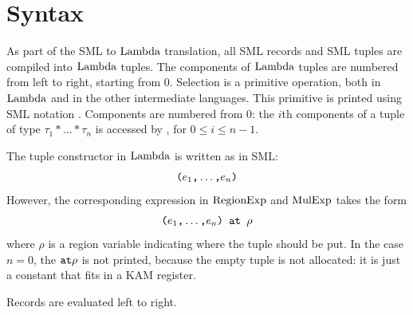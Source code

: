 \documentclass[12pt]{book}
\begin{document}
\section{Syntax}
As part of the SML to $\hbox{\rm Lambda}$ translation, all SML records and SML tuples are compiled into
$\hbox{\rm Lambda}$ tuples. The components of $\hbox{\rm Lambda}$ tuples are numbered from left to right, starting from 0.
Selection is a primitive operation, both in $\hbox{\rm Lambda}$ and in the other
intermediate languages. This primitive is printed using SML notation 
. Components are numbered from 0: the $i$th components of
a tuple of type $\tau_1\ast\ldots\ast\tau_n$ is accessed by
, for $0\leq i\leq n-1$. 

The tuple constructor in $\hbox{\rm Lambda}$ is written as in SML:
$$\hbox{\tt (}e_1\hbox{\tt ,}\ldots\hbox{\tt ,}e_n\hbox{\tt )}$$
However, the corresponding expression in $\hbox{\rm RegionExp}$ and $\hbox{\rm MulExp}$ takes the form
$$\hbox{\tt (}e_1\hbox{\tt ,}\ldots\hbox{\tt ,}e_n\hbox{\tt ) at\ }\rho$$
where $\rho$ is a region variable indicating where the tuple should be put.
In the case $n=0$,  the $\mathbin{\hbox{\tt at}}\rho$ is not printed, because the empty tuple is not
allocated: it is just a constant that fits in a KAM register.

Records are evaluated left to right.
\end{document}
